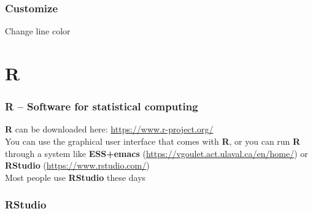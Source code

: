 \documentclass[color=usenames,dvipsnames]{beamer}\usepackage[]{graphicx}\usepackage[]{xcolor}
\begin{document}
\begin{frame}
  \frametitle{Customize}
    \begin{center}
      Change line color
    \end{center}
\end{frame}



\section{R}


\begin{frame}[fragile]
  \frametitle{R -- Software for statistical computing}
  {\bf R} can be downloaded here: \url{https://www.r-project.org/} \\
  \pause
  \vfill
  You can use the graphical user interface that comes with {\bf R}, or you
  can run {\bf R} through a system like {\bf ESS+emacs}
  (\url{https://vgoulet.act.ulaval.ca/en/home/}) or {\bf RStudio}
  (\url{https://www.rstudio.com/}) \\
  \pause
  \vfill
  Most people use {\bf RStudio} these days
\end{frame}


\begin{frame}
  \frametitle{RStudio}
\end{frame}
\end{document}
